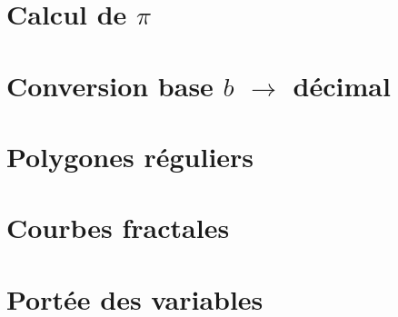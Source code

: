 \documentclass[11pt,a4paper]{article}
\begin{document}

\section{Calcul de $\pi$}


\section{Conversion base $b$ $\rightarrow$ décimal}


\section{Polygones réguliers}


\section{Courbes fractales}
%

{}

\section{Portée des variables}
%
\end{document}
